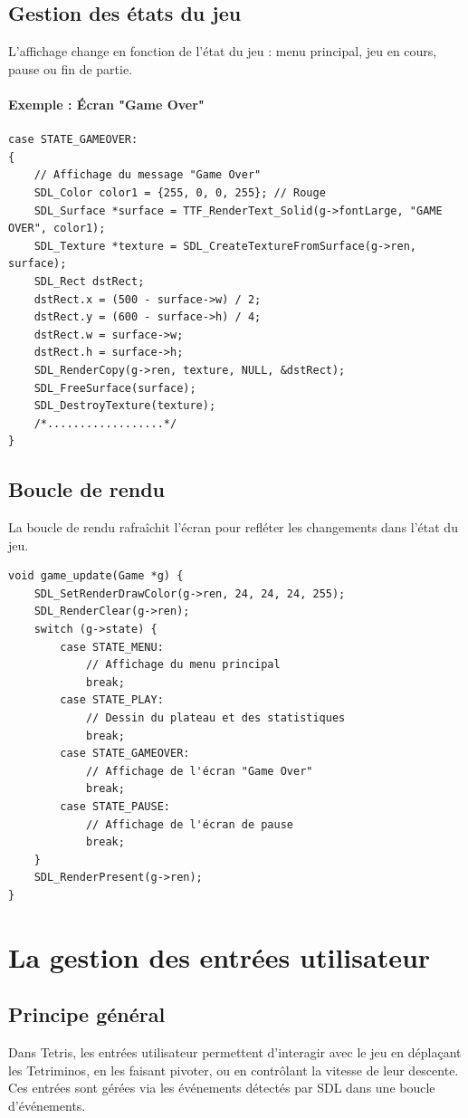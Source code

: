 \documentclass[12pt,a4paper]{report}
\begin{document}
\subsection{Gestion des états du jeu}
L’affichage change en fonction de l’état du jeu : menu principal, jeu en cours, pause ou fin de partie.

\paragraph{Exemple : Écran "Game Over"}
\begin{lstlisting}
case STATE_GAMEOVER:
{
    // Affichage du message "Game Over"
    SDL_Color color1 = {255, 0, 0, 255}; // Rouge
    SDL_Surface *surface = TTF_RenderText_Solid(g->fontLarge, "GAME OVER", color1);
    SDL_Texture *texture = SDL_CreateTextureFromSurface(g->ren, surface);
    SDL_Rect dstRect;
    dstRect.x = (500 - surface->w) / 2;
    dstRect.y = (600 - surface->h) / 4;
    dstRect.w = surface->w;
    dstRect.h = surface->h;
    SDL_RenderCopy(g->ren, texture, NULL, &dstRect);
    SDL_FreeSurface(surface);
    SDL_DestroyTexture(texture);
    /*..................*/
}
\end{lstlisting}

\subsection{Boucle de rendu}
La boucle de rendu rafraîchit l’écran pour refléter les changements dans l’état du jeu.

\begin{lstlisting}
void game_update(Game *g) {
    SDL_SetRenderDrawColor(g->ren, 24, 24, 24, 255);
    SDL_RenderClear(g->ren);
    switch (g->state) {
        case STATE_MENU:
            // Affichage du menu principal
            break;
        case STATE_PLAY:
            // Dessin du plateau et des statistiques
            break;
        case STATE_GAMEOVER:
            // Affichage de l'écran "Game Over"
            break;
        case STATE_PAUSE:
            // Affichage de l'écran de pause
            break;
    }
    SDL_RenderPresent(g->ren);
}
\end{lstlisting}

\newpage
\section{La gestion des entrées utilisateur}

\subsection{Principe général}
Dans Tetris, les entrées utilisateur permettent d’interagir avec le jeu en déplaçant les Tetriminos, en les faisant pivoter, ou en contrôlant la vitesse de leur descente. Ces entrées sont gérées via les événements détectés par SDL dans une boucle d’événements.
\end{document}
